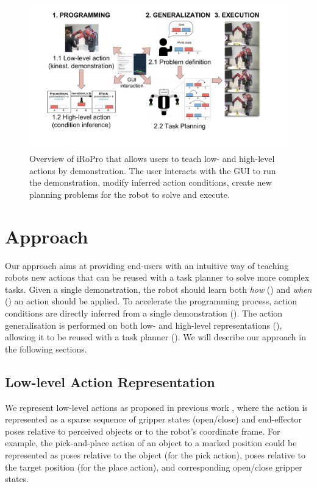 
  \begin{figure}[t]
   \centering
\includegraphics[width=0.7\linewidth]{figures/overview.pdf}
   \caption{Overview of iRoPro that allows users to teach low- and high-level actions by demonstration. The user interacts with the GUI to run the demonstration, modify inferred action conditions, create new planning problems for the robot to solve and execute.}
   \label{fig:overview}
  \end{figure}	
  \section{Approach}
\label{sec:approach}
Our approach aims at providing end-users with an intuitive way of teaching robots new actions that can be reused with a task planner to solve more complex tasks.
Given a single demonstration, the robot should learn both \textit{how} () and \textit{when} () an action should be applied.
To accelerate the programming process, action conditions are directly inferred from a single demonstration ().
The action generalisation is performed on both low- and high-level representations (), allowing it to be reused with a task planner ().
We will describe our approach in the following sections.

\subsection{Low-level Action Representation}
\label{sec:lowlevel}
We represent low-level actions as proposed in previous work \cite{akgun2012keyframe,alexandrova2014robot}, where the action is represented as a sparse sequence of gripper states (open/close) and end-effector poses relative to perceived objects or to the robot's coordinate frame.
For example, the pick-and-place action of an object to a marked position could be represented as poses relative to the object (for the pick action), poses relative to the target position (for the place action), and corresponding open/close gripper states. 

